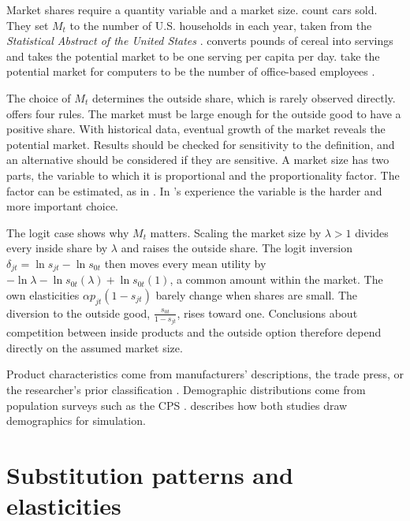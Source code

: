 Market shares require a quantity variable and a market size. \citet{BerryLevinsohnPakes1995} count cars sold.
They set $M_t$ to the number of U.S. households in each year, taken from the \emph{Statistical Abstract of the
United States} \citep[p.~869]{BerryLevinsohnPakes1995}. \citet{Nevo2001} converts pounds of cereal into
servings and takes the potential market to be one serving per capita per day. \citet{BresnahanSternTrajtenberg1997}
take the potential market for computers to be the number of office-based employees
\citep[p.~527]{Nevo2000a}.

The choice of $M_t$ determines the outside share, which is rarely observed directly. \citet[p.~527]{Nevo2000a}
offers four rules. The market must be large enough for the outside good to have a positive share. With
historical data, eventual growth of the market reveals the potential market. Results should be checked for
sensitivity to the definition, and an alternative should be considered if they are sensitive. A market size
has two parts, the variable to which it is proportional and the proportionality factor. The factor can be
estimated, as in \citet{BerryCarnallSpiller2006}. In \citeauthor{Nevo2000a}'s experience the variable is the
harder and more important choice.

The logit case shows why $M_t$ matters. Scaling the market size by $\lambda > 1$ divides every inside share by
$\lambda$ and raises the outside share. The logit inversion $\delta_{jt} = \ln s_{jt} - \ln s_{0t}$ then moves
every mean utility by $-\ln\lambda - \ln s_{0t}(\lambda) + \ln s_{0t}(1)$, a common amount within the market.
The own elasticities $\alpha p_{jt}(1 - s_{jt})$ barely change when shares are small. The diversion to the outside good,
$\frac{s_{0t}}{1 - s_{jt}}$, rises toward one. Conclusions about competition between inside products and the
outside option therefore depend directly on the assumed market size.

Product characteristics come from manufacturers' descriptions, the trade press, or the researcher's prior
classification \citep[p.~527]{Nevo2000a}. Demographic distributions come from population surveys such as the
CPS \citep[p.~528]{Nevo2000a}.  describes how both studies draw demographics for
simulation.

\section{Substitution patterns and elasticities}\label{sec:08-substitution}

